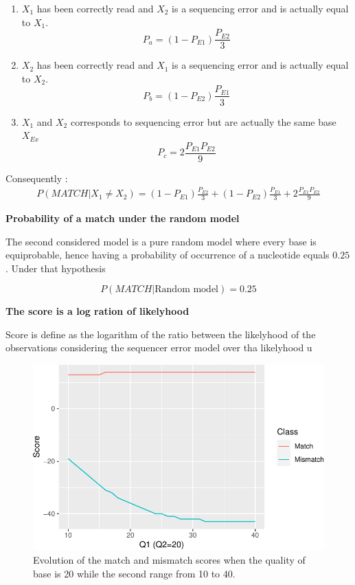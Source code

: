 \documentclass[
  letterpaper,
  DIV=11,
  numbers=noendperiod]{scrreprt}
\providecommand{\tightlist}{%
  \setlength{\itemsep}{0pt}\setlength{\parskip}{0pt}}\usepackage{longtable,booktabs,array}
\begin{document}
\begin{enumerate}
\def\labelenumi{\alph{enumi}.}
\tightlist
\item
  \(X_1\) has been correctly read and \(X_2\) is a sequencing error and
  is actually equal to \(X_1\). \[
  P_a =  (1-P_{E1})\frac{P_{E2}}{3}
  \]
\item
  \(X_2\) has been correctly read and \(X_1\) is a sequencing error and
  is actually equal to \(X_2\). \[
  P_b =  (1-P_{E2})\frac{P_{E1}}{3}
  \]
\item
  \(X_1\) and \(X_2\) corresponds to sequencing error but are actually
  the same base \(X_{Ex}\) \[
  P_c = 2\frac{P_{E1} P_{E2}}{9}
  \]
\end{enumerate}

Consequently : \[
\begin{aligned}
P(MATCH | X_1 \neq X_2) =  (1-P_{E1})\frac{P_{E2}}{3} +  (1-P_{E2})\frac{P_{E1}}{3} + 2\frac{P_{E1} P_{E2}}{9}
\end{aligned}
\]

\textbf{Probability of a match under the random model}

The second considered model is a pure random model where every base is
equiprobable, hence having a probability of occurrence of a nucleotide
equals \(0.25\). Under that hypothesis

\[
P(MATCH | \text{Random model}) = 0.25
\]

\textbf{The score is a log ration of likelyhood}

Score is define as the logarithm of the ratio between the likelyhood of
the observations considering the sequencer error model over tha
likelyhood u

\begin{figure}

{\centering \includegraphics{./comm_computation_files/figure-pdf/unnamed-chunk-1-1.pdf}

}

\caption{Evolution of the match and mismatch scores when the quality of
base is 20 while the second range from 10 to 40.}

\end{figure}
\end{document}
